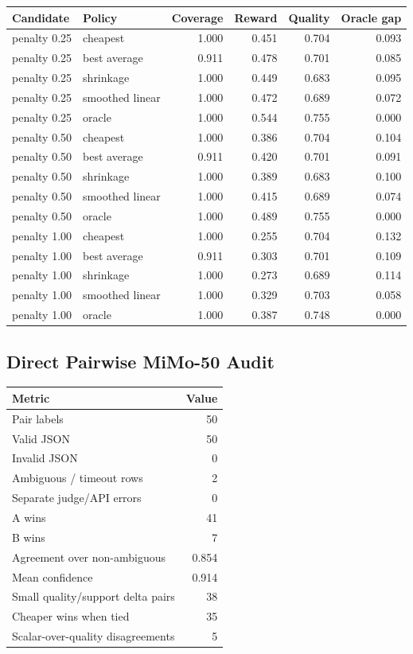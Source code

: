 \begin{longtable}{l l r r r r}
\toprule
Candidate & Policy & Coverage & Reward & Quality & Oracle gap \\
\midrule
penalty 0.25 & cheapest & 1.000 & 0.451 & 0.704 & 0.093 \\
penalty 0.25 & best average & 0.911 & 0.478 & 0.701 & 0.085 \\
penalty 0.25 & shrinkage & 1.000 & 0.449 & 0.683 & 0.095 \\
penalty 0.25 & smoothed linear & 1.000 & 0.472 & 0.689 & 0.072 \\
penalty 0.25 & oracle & 1.000 & 0.544 & 0.755 & 0.000 \\
penalty 0.50 & cheapest & 1.000 & 0.386 & 0.704 & 0.104 \\
penalty 0.50 & best average & 0.911 & 0.420 & 0.701 & 0.091 \\
penalty 0.50 & shrinkage & 1.000 & 0.389 & 0.683 & 0.100 \\
penalty 0.50 & smoothed linear & 1.000 & 0.415 & 0.689 & 0.074 \\
penalty 0.50 & oracle & 1.000 & 0.489 & 0.755 & 0.000 \\
penalty 1.00 & cheapest & 1.000 & 0.255 & 0.704 & 0.132 \\
penalty 1.00 & best average & 0.911 & 0.303 & 0.701 & 0.109 \\
penalty 1.00 & shrinkage & 1.000 & 0.273 & 0.689 & 0.114 \\
penalty 1.00 & smoothed linear & 1.000 & 0.329 & 0.703 & 0.058 \\
penalty 1.00 & oracle & 1.000 & 0.387 & 0.748 & 0.000 \\
\bottomrule
\end{longtable}

\subsection{Direct Pairwise MiMo-50 Audit}

\begin{longtable}{l r}
\toprule
Metric & Value \\
\midrule
Pair labels & 50 \\
Valid JSON & 50 \\
Invalid JSON & 0 \\
Ambiguous / timeout rows & 2 \\
Separate judge/API errors & 0 \\
A wins & 41 \\
B wins & 7 \\
Agreement over non-ambiguous & 0.854 \\
Mean confidence & 0.914 \\
Small quality/support delta pairs & 38 \\
Cheaper wins when tied & 35 \\
Scalar-over-quality disagreements & 5 \\
\bottomrule
\end{longtable}

